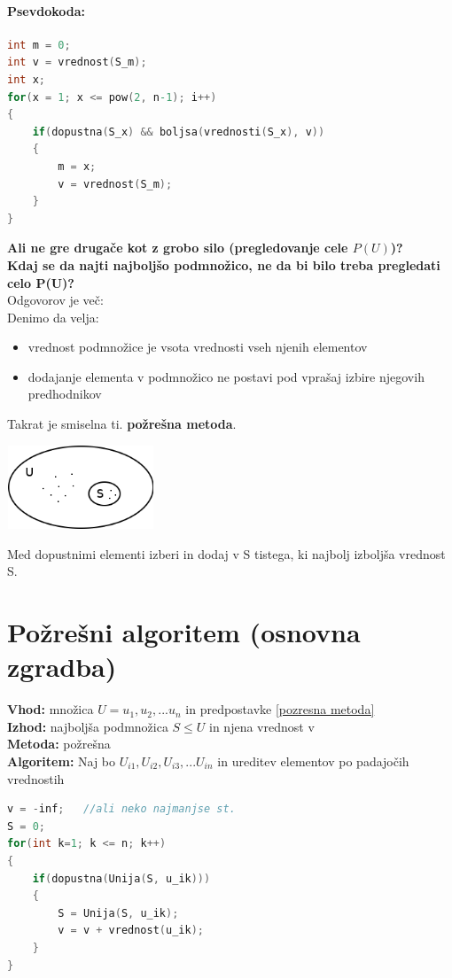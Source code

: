 \documentclass[a4paper,10pt]{article}
\begin{document}
\paragraph{Psevdokoda:}
\begin{flushleft}
\begin{lstlisting}[language=C]
int m = 0;
int v = vrednost(S_m);
int x;
for(x = 1; x <= pow(2, n-1); i++)
{
	if(dopustna(S_x) && boljsa(vrednosti(S_x), v))
	{
		m = x;
		v = vrednost(S_m);
	}
}
\end{lstlisting}
\end{flushleft}
\textbf{Ali ne gre druga\v ce kot z grobo silo (pregledovanje cele $P(U)$)?\\
Kdaj se da najti najbolj\v so podmno\v zico, ne da bi bilo treba pregledati celo P(U)?}\\
Odgovorov je ve\v c:\\
Denimo da velja: \label{pozresna metoda}
\begin{itemize}
\item vrednost podmno\v zice je vsota vrednosti vseh njenih elementov
\item dodajanje elementa v podmno\v zico ne postavi pod vpra\v saj izbire njegovih predhodnikov
\end{itemize}
Takrat je smiselna ti. \textbf{po\v zre\v sna metoda}.
	\begin{center}
	\includegraphics[width=4.4cm,height=2.5cm]{Slike/PozresnaMetoda.png}
	\end{center}
Med dopustnimi elementi izberi in dodaj v S tistega, ki najbolj izbolj\v sa vrednost S.

\section{Po\v zre\v sni algoritem (osnovna zgradba)}

\textbf{Vhod:} mno\v zica $U={u_1, u_2,... u_n}$ in predpostavke \ref{pozresna metoda}\\
\textbf{Izhod:} najbolj\v sa podmno\v zica $S \leq U$ in njena vrednost v\\
\textbf{Metoda:} po\v zre\v sna\\
\textbf{Algoritem:} Naj bo $U_{i1}, U_{i2}, U_{i3},... U_{in}$ in ureditev elementov po padajo\v cih vrednostih\\
\begin{lstlisting}[language=C]
v = -inf;	//ali neko najmanjse st.
S = 0;
for(int k=1; k <= n; k++)
{
	if(dopustna(Unija(S, u_ik)))
	{
		S = Unija(S, u_ik);
		v = v + vrednost(u_ik);
	}
}
\end{lstlisting}
\end{document}
